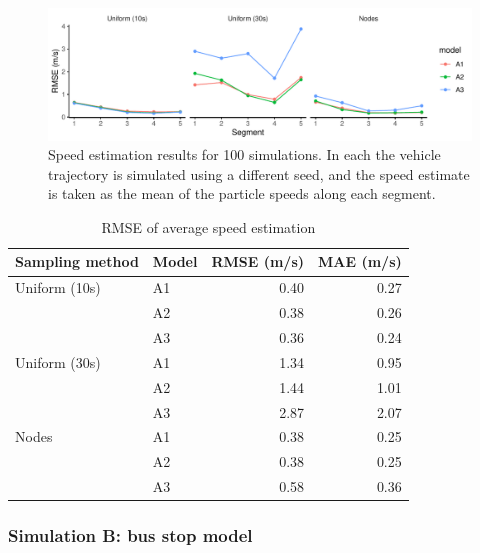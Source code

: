 \begin{knitrout}\small
{}\color{fgcolor}\begin{figure}
\includegraphics[width=\linewidth]{figure/sim1_pf_full-1} \caption[Speed estimation results for 100 simulations]{Speed estimation results for 100 simulations. In each the vehicle trajectory is simulated using a different seed, and the speed estimate is taken as the mean of the particle speeds along each segment.}\label{fig:sim1_pf_full}
\end{figure}

\begin{table}

\caption{\label{tab:sim1_pf_full}RMSE of average speed estimation}
\centering
\fontsize{8}{10}\selectfont
\begin{tabular}[t]{llrr}
\toprule
Sampling method & Model & RMSE (m/s) & MAE (m/s)\\
\midrule
Uniform (10s) & A1 & 0.40 & 0.27\\
 & A2 & 0.38 & 0.26\\
 & A3 & 0.36 & 0.24\\
\midrule
Uniform (30s) & A1 & 1.34 & 0.95\\
 & A2 & 1.44 & 1.01\\
 & A3 & 2.87 & 2.07\\
\midrule
Nodes & A1 & 0.38 & 0.25\\
 & A2 & 0.38 & 0.25\\
 & A3 & 0.58 & 0.36\\
\bottomrule
\end{tabular}
\end{table}


\end{knitrout}



\subsubsection{Simulation B: bus stop model}
\label{sec:vehicle_sim_B}

